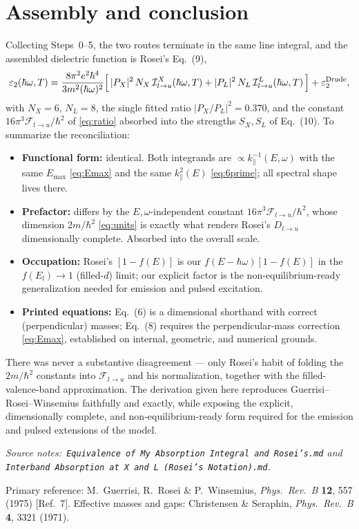 \documentclass[11pt]{article}
\newcommand{\kpar}{k_{\parallel}}
\newcommand{\hw}{\hbar\omega}
\newcommand{\Flu}{\mathcal{F}_{l\to u}}
\newcommand{\Dlu}{D_{l\to u}}
\newcommand{\Ic}{\mathcal{I}_{l\to u}}
\newcommand{\Rq}[1]{\textcolor{roseicol}{\textnormal{(#1)}}}
\begin{document}
\section{Assembly and conclusion}
\label{sec:conclusion}

Collecting Steps~0--5, the two routes terminate in the same line integral, and the
assembled dielectric function is Rosei's Eq.~\Rq{9},
%
\begin{equation}
\varepsilon_2(\hw,T)=\frac{8\pi^2e^2\hbar^4}{3m^2(\hw)^2}
\Bigl[\,|P_X|^2\,N_X\,\Ic^{X}(\hw,T)+|P_L|^2\,N_L\,\Ic^{L}(\hw,T)\,\Bigr]
+\varepsilon_2^{\text{Drude}},
\end{equation}
%
with $N_X=6$, $N_L=8$, the single fitted ratio $|P_X/P_L|^2=0.370$, and the constant
$16\pi^3\Flu/\hbar^2$ of \eqref{eq:ratio} absorbed into the strengths $S_X,S_L$ of
Eq.~\Rq{10}. To summarize the reconciliation:

\begin{itemize}
\item \textbf{Functional form:} identical. Both integrands are
      $\propto\kpar^{-1}(E,\omega)$ with the same $E_{\max}$ \eqref{eq:Emax} and the same
      $\kpar^2(E)$ \eqref{eq:6prime}; all spectral shape lives there.
\item \textbf{Prefactor:} differs by the $E,\omega$-independent constant
      $16\pi^3\Flu/\hbar^2$, whose dimension $2m/\hbar^2$ \eqref{eq:units} is exactly what
      renders Rosei's $\Dlu$ dimensionally complete. Absorbed into the overall scale.
\item \textbf{Occupation:} Rosei's $[1-f(E)]$ is our $f(E-\hw)[1-f(E)]$ in the
      $f(E_l)\to1$ (filled-$d$) limit; our explicit factor is the non-equilibrium-ready
      generalization needed for emission and pulsed excitation.
\item \textbf{Printed equations:} Eq.~\Rq{6} is a dimensional shorthand with correct
      (perpendicular) masses; Eq.~\Rq{8} requires the perpendicular-mass correction
      \eqref{eq:Emax}, established on internal, geometric, and numerical grounds.
\end{itemize}

There was never a substantive disagreement --- only Rosei's habit of folding the
$2m/\hbar^2$ constants into $\Flu$ and his normalization, together with the
filled-valence-band approximation. The derivation given here reproduces Guerrisi--Rosei--Winsemius
faithfully and exactly, while exposing the explicit, dimensionally complete, and
non-equilibrium-ready form required for the emission and pulsed extensions of the model.

\vfill
\begin{sloppypar}
{\footnotesize\itshape
Source notes:\ \texttt{Equivalence of My Absorption Integral and Rosei's.md} and
\texttt{Interband Absorption at X and L (Rosei's Notation).md}.\par
Primary reference: M.~Guerrisi, R.~Rosei \& P.~Winsemius,
\textit{Phys.\ Rev.\ B} \textbf{12}, 557 (1975) [Ref.~7].
Effective masses and gaps: Christensen \& Seraphin, \textit{Phys.\ Rev.\ B} \textbf{4}, 3321 (1971).}
\end{sloppypar}
\end{document}
